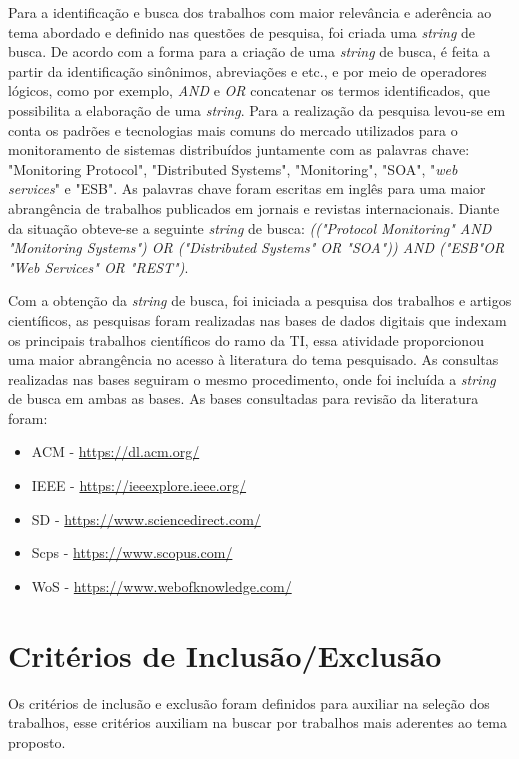 Para a identificação e busca dos trabalhos com maior relevância e aderência ao tema abordado e definido nas questões de pesquisa, foi criada uma \textit{string} de busca. De acordo com \cite{keele2007guidelines} a forma para a criação de uma \textit{string} de busca, é feita a partir da identificação sinônimos, abreviações e etc., e por meio de operadores lógicos, como por exemplo, \textit{AND} e \textit{OR}  concatenar os termos identificados, que possibilita a elaboração de uma \textit{string}. Para a realização da pesquisa levou-se em conta os padrões e tecnologias mais comuns do mercado utilizados para o monitoramento de sistemas distribuídos juntamente com as palavras chave: "Monitoring Protocol", "Distributed Systems", "Monitoring", "\acrshort{SOA}", "\textit{web services}" e "\acrshort{ESB}". As palavras chave foram escritas em inglês para uma maior abrangência de trabalhos publicados em jornais e revistas internacionais. Diante da situação obteve-se a seguinte \textit{string} de busca: \textit{(("Protocol Monitoring" AND "Monitoring Systems") OR ("Distributed Systems" OR "SOA")) AND ("ESB"OR "Web Services" OR "REST")}.

Com a obtenção da \textit{string} de busca, foi iniciada a pesquisa dos trabalhos e artigos científicos, as pesquisas foram realizadas nas bases de dados digitais que indexam os principais trabalhos científicos do ramo da \acrlong{TI}, essa atividade proporcionou uma maior abrangência no acesso à literatura do tema pesquisado\cite{kitchenham2007guidelines}. As consultas realizadas nas bases seguiram o mesmo procedimento, onde foi incluída a \textit{string} de busca em ambas as bases. As bases consultadas para revisão da literatura foram:
\begin{itemize}
\item \acrlong{ACM} - \url{https://dl.acm.org/}
\item \acrlong{IEEE} - \url{https://ieeexplore.ieee.org/}
\item \acrlong{SD} - \url{https://www.sciencedirect.com/}
\item \acrlong{Scps} - \url{https://www.scopus.com/}
\item \acrlong{WoS} - \url{https://www.webofknowledge.com/}
\end{itemize}


\section{Critérios de Inclusão/Exclusão}
Os critérios de inclusão e exclusão foram definidos para auxiliar na seleção dos trabalhos, esse critérios auxiliam na buscar por trabalhos mais aderentes ao tema proposto. 

